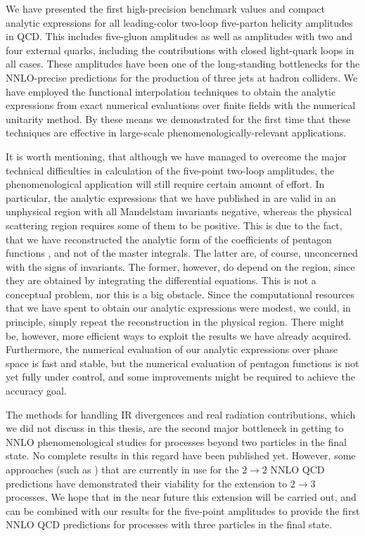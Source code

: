 We have presented the first high-precision benchmark values and compact analytic expressions
for all leading-color two-loop five-parton helicity amplitudes in QCD. This includes
five-gluon amplitudes as well as amplitudes with two and four
external quarks, including the contributions with closed light-quark loops in all cases.
These amplitudes have been one of the long-standing bottlenecks for the NNLO-precise predictions for the production of three jets at hadron colliders.
We have employed the functional interpolation techniques to obtain the analytic expressions from exact numerical evaluations over finite fields
with the numerical unitarity method.
By these means we demonstrated for the first time that these techniques are effective in large-scale phenomenologically-relevant applications.

It is worth mentioning,
that although we have managed to overcome the major technical difficulties in calculation of the five-point two-loop amplitudes,
the phenomenological application will still require certain amount of effort. In particular,
the analytic expressions that we have published in \cite{Abreu:2019odu} are valid in an unphysical region with all Mandelstam invariants negative, whereas
the physical scattering region requires some of them to be positive.
This is due to the fact, that we have reconstructed the analytic form of the coefficients of pentagon functions \cite{Gehrmann:2018yef}, and not of the master integrals.
The latter are, of course, unconcerned with the signs of invariants.
The former, however, do depend on the region, since they are obtained by integrating the differential equations.
This is not a conceptual problem, nor this is a big obstacle.
Since the computational resources that we have spent to obtain our analytic expressions were modest, we
could, in principle, simply repeat the reconstruction in the physical region.
There might be, however, more efficient ways to exploit the results we have already acquired.
Furthermore, the numerical evaluation of our analytic expressions over phase space is fast and stable,
but the numerical evaluation of pentagon functions is not yet fully under control, and some improvements might be required to 
achieve the accuracy goal. 

The methods for handling IR divergences and real radiation contributions, which we did not discuss in this thesis,
are the second major bottleneck in getting to NNLO phenomenological studies for processes beyond
two particles in the final state. No complete results in this regard have been published yet.
However, some approaches (such as \cite{GehrmannDeRidder:2005cm,Czakon:2010td,Currie:2013vh}) that are currently in use for the $2\to 2$
NNLO QCD predictions have demonstrated their viability for the extension to $2\to 3$ processes.
We hope that in the near future this extension will be carried out, and can be combined with our results for the five-point amplitudes
to provide the first NNLO QCD predictions for processes with three particles in the final state.

